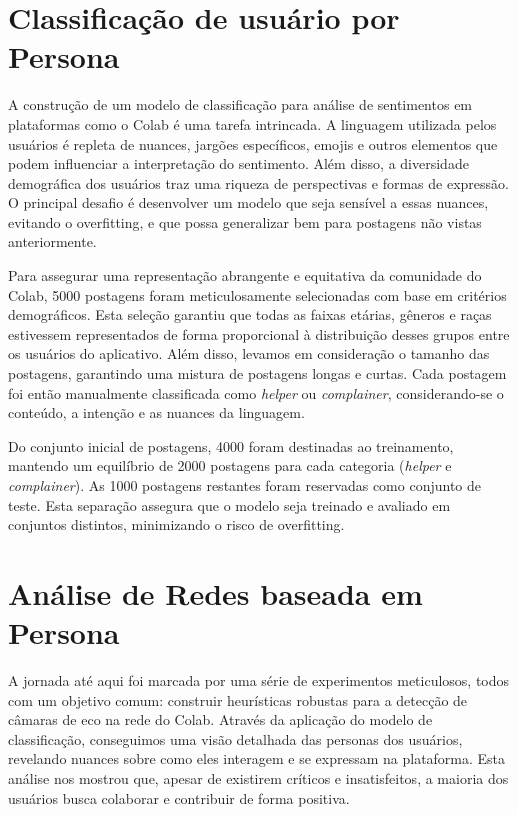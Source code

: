 \section{Classificação de usuário por Persona}

A construção de um modelo de classificação para análise de sentimentos em plataformas como o Colab é uma tarefa intrincada. A linguagem utilizada pelos usuários é repleta de nuances, jargões específicos, emojis e outros elementos que podem influenciar a interpretação do sentimento. Além disso, a diversidade demográfica dos usuários traz uma riqueza de perspectivas e formas de expressão. O principal desafio é desenvolver um modelo que seja sensível a essas nuances, evitando o overfitting, e que possa generalizar bem para postagens não vistas anteriormente.

Para assegurar uma representação abrangente e equitativa da comunidade do Colab, 5000 postagens foram meticulosamente selecionadas com base em critérios demográficos. Esta seleção garantiu que todas as faixas etárias, gêneros e raças estivessem representados de forma proporcional à distribuição desses grupos entre os usuários do aplicativo. Além disso, levamos em consideração o tamanho das postagens, garantindo uma mistura de postagens longas e curtas. Cada postagem foi então manualmente classificada como \textit{helper} ou \textit{complainer}, considerando-se o conteúdo, a intenção e as nuances da linguagem.

Do conjunto inicial de postagens, 4000 foram destinadas ao treinamento, mantendo um equilíbrio de 2000 postagens para cada categoria (\textit{helper} e \textit{complainer}). As 1000 postagens restantes foram reservadas como conjunto de teste. Esta separação assegura que o modelo seja treinado e avaliado em conjuntos distintos, minimizando o risco de overfitting.

\section{Análise de Redes baseada em Persona}

A jornada até aqui foi marcada por uma série de experimentos meticulosos, todos com um objetivo comum: construir heurísticas robustas para a detecção de câmaras de eco na rede do Colab. Através da aplicação do modelo de classificação, conseguimos uma visão detalhada das personas dos usuários, revelando nuances sobre como eles interagem e se expressam na plataforma. Esta análise nos mostrou que, apesar de existirem críticos e insatisfeitos, a maioria dos usuários busca colaborar e contribuir de forma positiva.

